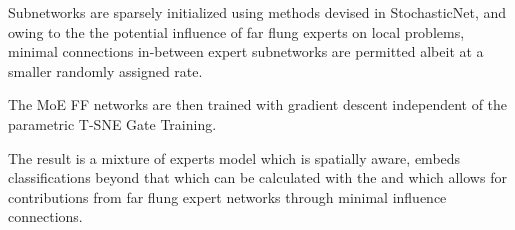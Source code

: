 \documentclass{llncs}
\begin{document}
Subnetworks are sparsely initialized using methods devised in StochasticNet, and owing to
the the potential influence of far flung experts on local problems, minimal connections
in-between expert subnetworks are permitted albeit at a smaller randomly assigned rate.

The MoE FF networks are then trained with gradient descent independent of the parametric
T-SNE Gate Training.

The result is a mixture of experts model which is spatially aware, embeds classifications
beyond that which can be calculated with the and which allows for contributions from far
flung expert networks through minimal influence connections.

%
%
 

 

\end{document}
